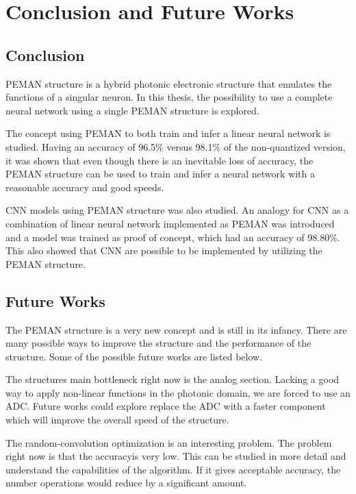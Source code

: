 \chapter{Conclusion and Future Works}

\section{Conclusion}

PEMAN structure \cite{demarinisCodesignedIntegratedPhotonic2022} is a hybrid photonic electronic structure that emulates the functions of a singular neuron. In this thesis, the possibility to use a complete neural network using a single PEMAN structure is explored.

The concept using PEMAN to both train and infer a linear neural network is studied. Having an accuracy of 96.5\% versus 98.1\% of the non-quantized version, it was shown that even though there is an inevitable loss of accuracy, the PEMAN structure can be used to train and infer a neural network with a reasonable accuracy and good speeds.

CNN models using PEMAN structure was also studied. An analogy for CNN as a combination of linear neural network implemented as PEMAN was introduced and a model was trained as proof of concept, which had an accuracy of 98.80\%. This also showed that CNN are possible to be implemented by utilizing the PEMAN structure.

\section{Future Works}

The PEMAN structure is a very new concept and is still in its infancy. There are many possible ways to improve the structure and the performance of the structure. Some of the possible future works are listed below.

The structures main bottleneck right now is the analog section. Lacking a good way to apply non-linear functions in the photonic domain, we are forced to use an ADC. Future works could explore replace the ADC with a faster component which will improve the overall speed of the structure.

The random-convolution optimization is an interesting problem. The problem right now is that the accuracyis very low. This can be studied in more detail and understand the capabilities of the algorithm. If it gives acceptable accuracy, the number operations would reduce by a significant amount.